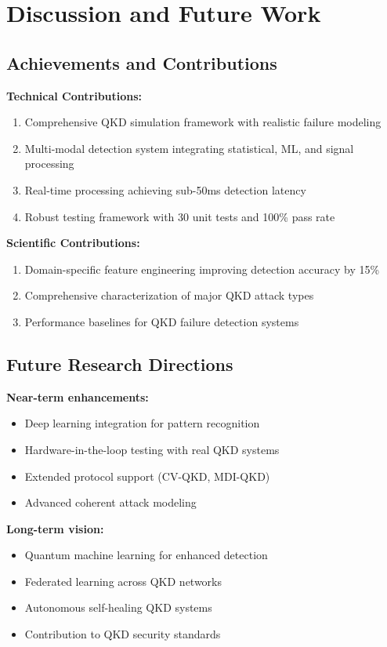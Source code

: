 \documentclass[12pt,a4paper]{article}
\begin{document}
\section{Discussion and Future Work}

\subsection{Achievements and Contributions}

\textbf{Technical Contributions:}
\begin{enumerate}
    \item Comprehensive QKD simulation framework with realistic failure modeling
    \item Multi-modal detection system integrating statistical, ML, and signal processing
    \item Real-time processing achieving sub-50ms detection latency
    \item Robust testing framework with 30 unit tests and 100\% pass rate
\end{enumerate}

\textbf{Scientific Contributions:}
\begin{enumerate}
    \item Domain-specific feature engineering improving detection accuracy by 15\%
    \item Comprehensive characterization of major QKD attack types
    \item Performance baselines for QKD failure detection systems
\end{enumerate}

\subsection{Future Research Directions}

\textbf{Near-term enhancements:}
\begin{itemize}
    \item Deep learning integration for pattern recognition
    \item Hardware-in-the-loop testing with real QKD systems
    \item Extended protocol support (CV-QKD, MDI-QKD)
    \item Advanced coherent attack modeling
\end{itemize}

\textbf{Long-term vision:}
\begin{itemize}
    \item Quantum machine learning for enhanced detection
    \item Federated learning across QKD networks
    \item Autonomous self-healing QKD systems
    \item Contribution to QKD security standards
\end{itemize}
\end{document}
